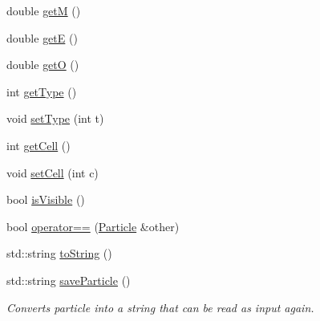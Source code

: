\begin{DoxyCompactItemize}
\item 
double \hyperlink{classSimulation_1_1Particle_aa1ca800f9be9dd4bd6c604f608095b24}{get\-M} ()
\item 
double \hyperlink{classSimulation_1_1Particle_ad449ae6dec0265efb91b7a714563fa12}{get\-E} ()
\item 
double \hyperlink{classSimulation_1_1Particle_abef7a42b32e938861884c958019cf41b}{get\-O} ()
\item 
int \hyperlink{classSimulation_1_1Particle_a0581d7b629eb17ac5bef8e934852ca8b}{get\-Type} ()
\item 
void \hyperlink{classSimulation_1_1Particle_a03487469e558306b9d770fb547ab23a3}{set\-Type} (int t)
\item 
int \hyperlink{classSimulation_1_1Particle_a7e74baf0c324e1474f6e5a4a072e5e8b}{get\-Cell} ()
\item 
void \hyperlink{classSimulation_1_1Particle_a701c977a46c66ac52c901eb9ee517389}{set\-Cell} (int c)
\item 
bool \hyperlink{classSimulation_1_1Particle_a28a301c6d1f08f5b77bd091d79872517}{is\-Visible} ()
\item 
bool \hyperlink{classSimulation_1_1Particle_a5034babb77618a56e00927d8891afabe}{operator==} (\hyperlink{classSimulation_1_1Particle}{Particle} \&other)
\item 
std\-::string \hyperlink{classSimulation_1_1Particle_a07d071a0f91f8ce7413201a6db3afe7b}{to\-String} ()
\item 
std\-::string \hyperlink{classSimulation_1_1Particle_a17d10f7b358727e40123bbb8c829f54c}{save\-Particle} ()
\begin{DoxyCompactList}\small\item\em Converts particle into a string that can be read as input again. \end{DoxyCompactList}\end{DoxyCompactItemize}
